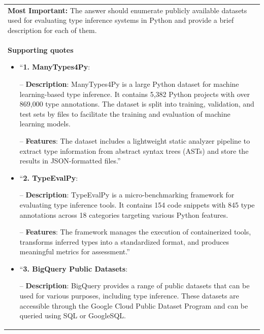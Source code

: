 \begin{table}[t!]
\begin{subtable}{\textwidth}
\begin{tabular}{p{14cm}}
\vspace{0.2cm}
\\\toprule 

{\bf Most Important:} The answer should enumerate publicly available datasets used for evaluating type inference systems in Python and provide a brief description for each of them. \\\midrule
\textbf{Supporting quotes}
\begin{itemize}
    \item ``\textbf{1. ManyTypes4Py}: 
    
    -- \textbf{Description}: ManyTypes4Py is a large Python dataset for machine learning-based type inference. It contains 5,382 Python projects with over 869,000 type annotations. The dataset is split into training, validation, and test sets by files to facilitate the training and evaluation of machine learning models. 
    
    -- \textbf{Features}: The dataset includes a lightweight static analyzer pipeline to extract type information from abstract syntax trees (ASTs) and store the results in JSON-formatted files.''
        \item ``\textbf{2. TypeEvalPy}: 
         
         -- \textbf{Description}: TypeEvalPy is a micro-benchmarking framework for evaluating type inference tools. It contains 154 code snippets with 845 type annotations across 18 categories targeting various Python features. 
         
         -- \textbf{Features}: The framework manages the execution of containerized tools, transforms inferred types into a standardized format, and produces meaningful metrics for assessment.''

        \item  ``\textbf{3. BigQuery Public Datasets}: 
        
        -- \textbf{Description}: BigQuery provides a range of public datasets that can be used for various purposes, including type inference. These datasets are accessible through the Google Cloud Public Dataset Program and can be queried using SQL or GoogleSQL. 
        

\end{itemize}
\end{tabular}
\end{subtable}
\end{table}
